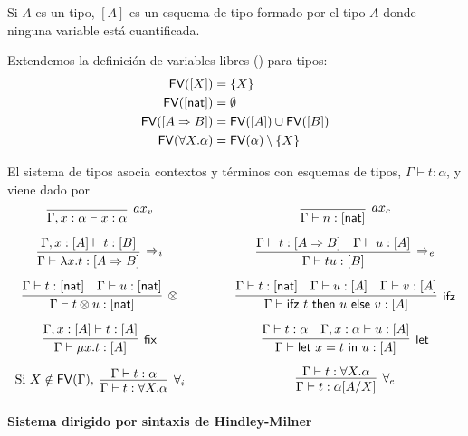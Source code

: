 \documentclass[twoside,a4paper,12pt]{article}
\theoremstyle{definition}
\theoremstyle{remark}
\begin{document}
Si $A$ es un tipo, $[A]$ es un esquema de tipo formado por el tipo $A$ donde
ninguna variable está cuantificada.

\begin{definicion}{6.3}
  Extendemos la definición de variables libres (\FV) para tipos:
  \begin{align*}
    \mathsf{FV}([X]) & = \{X\}\\
    \mathsf{FV}([\mathsf{nat}]) & = \emptyset\\
    \mathsf{FV}([A\Rightarrow B]) & = \mathsf{FV}([A])\cup\mathsf{FV}([B])\\
    \mathsf{FV}(\forall X.\alpha) & = \mathsf{FV}(\alpha)\setminus\{X\}
  \end{align*}
\end{definicion}

\begin{definicion}{6.4}
  El sistema de tipos asocia contextos y términos con esquemas de tipos,
  $\Gamma\vdash t:\alpha$, y viene dado por
  \[
    \begin{array}{c@{\qquad\qquad}c}
      \infer[ax_v]{\Gamma,x:\alpha\vdash x:\alpha}{}
      &
        \infer[ax_c]{\Gamma\vdash n:[\nat]}{}
      \\[2ex]
      \infer[\Rightarrow_i]{\Gamma\vdash\fun xt:[A\Rightarrow B]}
      {\Gamma,x:[A]\vdash t:[B]}
      &
        \infer[\Rightarrow_e]{\Gamma\vdash tu:[B]}
        {
        \Gamma\vdash t:[A\Rightarrow B]
      &
        \Gamma\vdash u:[A]
        }
      \\[2ex]
      \infer[\otimes]{\Gamma\vdash t\otimes u:[\nat]}
      {\Gamma\vdash t:[\nat] & \Gamma\vdash u:[\nat]}
      &
        \infer[\mathsf{ifz}]{\Gamma\vdash\ifz tuv:[A]}
        {\Gamma\vdash t:[\nat] & \Gamma\vdash u:[A] & \Gamma\vdash v:[A]}
      \\[2ex]
      \infer[\mathsf{fix}]{\Gamma\vdash\fix xt:[A]}{\Gamma,x:[A]\vdash t:[A]}
      &
        \infer[\mathsf{let}]{\Gamma\vdash\letl xtu:[A]}
        {\Gamma\vdash t:\alpha & \Gamma,x:\alpha\vdash u:[A]}
      \\[2ex]
      \textrm{Si }X\notin\FV(\Gamma),\ \vcenter{\infer[\forall_i]{\Gamma\vdash t:\forall X.\alpha}{\Gamma\vdash t:\alpha}}
      &
        \vcenter{\infer[\forall_e]{\Gamma\vdash t:\alpha[A/X]}{\Gamma\vdash t:\forall X.\alpha}}
    \end{array}
  \]
\end{definicion}

\paragraph*{Sistema dirigido por sintaxis de Hindley-Milner}
\end{document}
